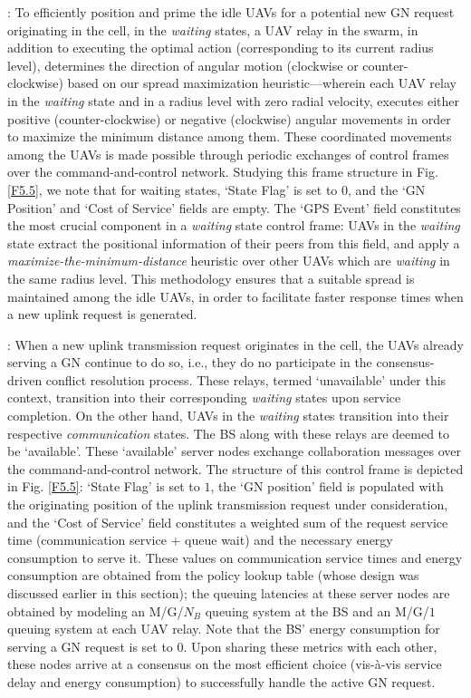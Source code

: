 \documentclass[12pt, draftcls, onecolumn]{IEEEtran}
\theoremstyle{plain}
\theoremstyle{definition}
\theoremstyle{remark}
\begin{document}
: To efficiently position and prime the idle UAVs for a potential new GN request originating in the cell, in the \emph{waiting} states, a UAV relay in the swarm, in addition to executing the optimal action (corresponding to its current radius level), determines the direction of angular motion (clockwise or counter-clockwise) based on our spread maximization heuristic---wherein each UAV relay in the \emph{waiting} state and in a radius level with zero radial velocity, executes either positive (counter-clockwise) or negative (clockwise) angular movements in order to maximize the minimum distance among them. These coordinated movements among the UAVs is made possible through periodic exchanges of control frames over the command-and-control network. Studying this frame structure in Fig. \ref{F5.5}, we note that for waiting states, `State Flag' is set to $0$, and the `GN Position' and `Cost of Service' fields are empty. The `GPS Event' field constitutes the most crucial component in a \emph{waiting} state control frame: UAVs in the \emph{waiting} state extract the positional information of their peers from this field, and apply a \emph{maximize-the-minimum-distance} heuristic over other UAVs which are \emph{waiting} in the same radius level. This methodology ensures that a suitable spread is maintained among the idle UAVs, in order to facilitate faster response times when a new uplink request is generated. 

: When a new uplink transmission request originates in the cell, the UAVs already serving a GN continue to do so, i.e., they do no participate in the consensus-driven conflict resolution process. These relays, termed `unavailable' under this context, transition into their corresponding \emph{waiting} states upon service completion. On the other hand, UAVs in the \emph{waiting} states transition into their respective \emph{communication} states. The BS along with these relays are deemed to be `available'. These `available' server nodes exchange collaboration messages over the command-and-control network. The structure of this control frame is depicted in Fig. \ref{F5.5}: `State Flag' is set to $1$, the `GN position' field is populated with the originating position of the uplink transmission request under consideration, and the `Cost of Service' field constitutes a weighted sum of the request service time (communication service + queue wait) and the necessary energy consumption to serve it. These values on communication service times and energy consumption are obtained from the policy lookup table (whose design was discussed earlier in this section); the queuing latencies at these server nodes are obtained by modeling an M/G/$N_{B}$ queuing system at the BS and an M/G/$1$ queuing system at each UAV relay. Note that the BS' energy consumption for serving a GN request is set to $0$. Upon sharing these metrics with each other, these nodes arrive at a consensus on the most efficient choice (vis-à-vis service delay and energy consumption) to successfully handle the active GN request.
\vspace{-4mm}
\end{document}
